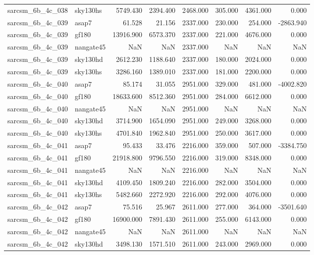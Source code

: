 \begin{tabular}{llrrrrrr}
sarcsm\_6b\_4c\_038 & sky130hs & 5749.430 & 2394.400 & 2468.000 & 305.000 & 4361.000 & 0.000 \\
sarcsm\_6b\_4c\_039 & asap7 & 61.528 & 21.156 & 2337.000 & 230.000 & 254.000 & -2863.940 \\
sarcsm\_6b\_4c\_039 & gf180 & 13916.900 & 6573.370 & 2337.000 & 221.000 & 4676.000 & 0.000 \\
sarcsm\_6b\_4c\_039 & nangate45 & NaN & NaN & 2337.000 & NaN & NaN & NaN \\
sarcsm\_6b\_4c\_039 & sky130hd & 2612.230 & 1188.640 & 2337.000 & 180.000 & 2024.000 & 0.000 \\
sarcsm\_6b\_4c\_039 & sky130hs & 3286.160 & 1389.010 & 2337.000 & 181.000 & 2200.000 & 0.000 \\
sarcsm\_6b\_4c\_040 & asap7 & 85.174 & 31.055 & 2951.000 & 329.000 & 481.000 & -4002.820 \\
sarcsm\_6b\_4c\_040 & gf180 & 18633.600 & 8512.360 & 2951.000 & 284.000 & 6612.000 & 0.000 \\
sarcsm\_6b\_4c\_040 & nangate45 & NaN & NaN & 2951.000 & NaN & NaN & NaN \\
sarcsm\_6b\_4c\_040 & sky130hd & 3714.900 & 1654.090 & 2951.000 & 249.000 & 3268.000 & 0.000 \\
sarcsm\_6b\_4c\_040 & sky130hs & 4701.840 & 1962.840 & 2951.000 & 250.000 & 3617.000 & 0.000 \\
sarcsm\_6b\_4c\_041 & asap7 & 95.433 & 33.476 & 2216.000 & 359.000 & 507.000 & -3384.750 \\
sarcsm\_6b\_4c\_041 & gf180 & 21918.800 & 9796.550 & 2216.000 & 319.000 & 8348.000 & 0.000 \\
sarcsm\_6b\_4c\_041 & nangate45 & NaN & NaN & 2216.000 & NaN & NaN & NaN \\
sarcsm\_6b\_4c\_041 & sky130hd & 4109.450 & 1809.240 & 2216.000 & 282.000 & 3504.000 & 0.000 \\
sarcsm\_6b\_4c\_041 & sky130hs & 5482.660 & 2272.920 & 2216.000 & 292.000 & 4076.000 & 0.000 \\
sarcsm\_6b\_4c\_042 & asap7 & 75.516 & 25.967 & 2611.000 & 277.000 & 364.000 & -3501.640 \\
sarcsm\_6b\_4c\_042 & gf180 & 16900.000 & 7891.430 & 2611.000 & 255.000 & 6143.000 & 0.000 \\
sarcsm\_6b\_4c\_042 & nangate45 & NaN & NaN & 2611.000 & NaN & NaN & NaN \\
sarcsm\_6b\_4c\_042 & sky130hd & 3498.130 & 1571.510 & 2611.000 & 243.000 & 2969.000 & 0.000 \\

\end{tabular}
